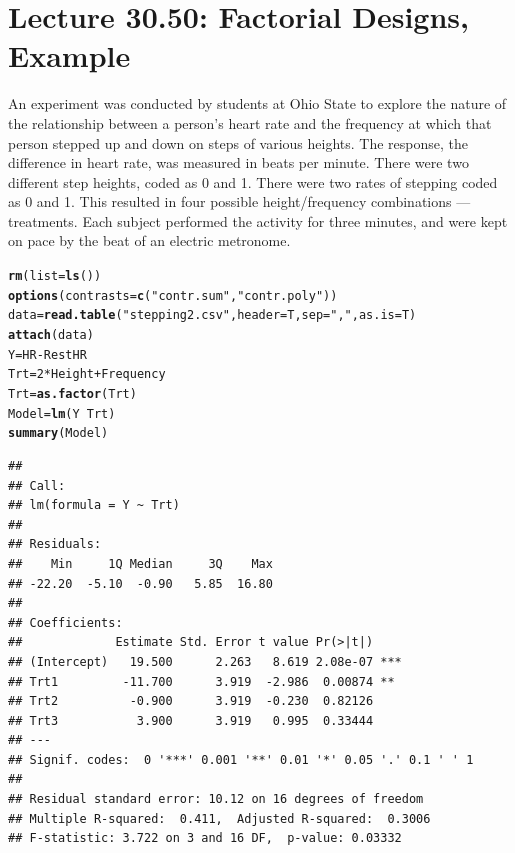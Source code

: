 \documentclass[oneside]{book}\usepackage[]{graphicx}\usepackage[dvipsnames,table,xcdraw]{xcolor}
\makeatletter
\newcommand{\hlnum}[1]{\textcolor[rgb]{0.686,0.059,0.569}{#1}}%
\newcommand{\hlstr}[1]{\textcolor[rgb]{0.192,0.494,0.8}{#1}}%
\newcommand{\hlopt}[1]{\textcolor[rgb]{0,0,0}{#1}}%
\newcommand{\hlstd}[1]{\textcolor[rgb]{0.345,0.345,0.345}{#1}}%
\newcommand{\hlkwb}[1]{\textcolor[rgb]{0.69,0.353,0.396}{#1}}%
\newcommand{\hlkwc}[1]{\textcolor[rgb]{0.333,0.667,0.333}{#1}}%
\newcommand{\hlkwd}[1]{\textcolor[rgb]{0.737,0.353,0.396}{\textbf{#1}}}%
\newenvironment{kframe}{%
 \def\at@end@of@kframe{}%
 \ifinner\ifhmode%
  \def\at@end@of@kframe{\end{minipage}}%
  \begin{minipage}{\columnwidth}%
 \fi\fi%
 \def\FrameCommand##1{\hskip\@totalleftmargin \hskip-\fboxsep
 \colorbox{shadecolor}{##1}\hskip-\fboxsep
     \hskip-\linewidth \hskip-\@totalleftmargin \hskip\columnwidth}%
 \MakeFramed {\advance\hsize-\width
   \@totalleftmargin\z@ \linewidth\hsize
   \@setminipage}}%
 {\par\unskip\endMakeFramed%
 \at@end@of@kframe}
\newenvironment{knitrout}{}{} %
\makeatother
\begin{document}


\section{Lecture 30.50: Factorial Designs, Example}
An experiment was conducted by students at Ohio State to explore the nature of the
relationship between a person's heart rate and the frequency at which that person
stepped up and down on steps of various heights. The response, the difference in heart
rate, was measured in beats per minute. There were two different step heights, coded
as 0 and 1. There were two rates of stepping coded as 0 and 1. This resulted in four
possible height/frequency combinations --- treatments. Each subject performed the
activity for three minutes, and were kept on pace by the beat of an electric metronome.
\begin{knitrout}
\color{fgcolor}\begin{kframe}
\begin{alltt}
\hlkwd{rm}\hlstd{(}\hlkwc{list} \hlstd{=} \hlkwd{ls}\hlstd{())}
\hlkwd{options}\hlstd{(}\hlkwc{contrasts} \hlstd{=} \hlkwd{c}\hlstd{(}\hlstr{"contr.sum"}\hlstd{,} \hlstr{"contr.poly"}\hlstd{))}
\hlstd{data} \hlkwb{=} \hlkwd{read.table}\hlstd{(}\hlstr{"stepping2.csv"}\hlstd{,} \hlkwc{header} \hlstd{= T,} \hlkwc{sep} \hlstd{=} \hlstr{","}\hlstd{,} \hlkwc{as.is} \hlstd{= T)}
\hlkwd{attach}\hlstd{(data)}
\hlstd{Y} \hlkwb{=} \hlstd{HR} \hlopt{-} \hlstd{RestHR}
\hlstd{Trt} \hlkwb{=} \hlnum{2} \hlopt{*} \hlstd{Height} \hlopt{+} \hlstd{Frequency}
\hlstd{Trt} \hlkwb{=} \hlkwd{as.factor}\hlstd{(Trt)}
\hlstd{Model} \hlkwb{=} \hlkwd{lm}\hlstd{(Y} \hlopt{~} \hlstd{Trt)}
\hlkwd{summary}\hlstd{(Model)}
\end{alltt}
\begin{verbatim}
## 
## Call:
## lm(formula = Y ~ Trt)
## 
## Residuals:
##    Min     1Q Median     3Q    Max 
## -22.20  -5.10  -0.90   5.85  16.80 
## 
## Coefficients:
##             Estimate Std. Error t value Pr(>|t|)    
## (Intercept)   19.500      2.263   8.619 2.08e-07 ***
## Trt1         -11.700      3.919  -2.986  0.00874 ** 
## Trt2          -0.900      3.919  -0.230  0.82126    
## Trt3           3.900      3.919   0.995  0.33444    
## ---
## Signif. codes:  0 '***' 0.001 '**' 0.01 '*' 0.05 '.' 0.1 ' ' 1
## 
## Residual standard error: 10.12 on 16 degrees of freedom
## Multiple R-squared:  0.411,	Adjusted R-squared:  0.3006 
## F-statistic: 3.722 on 3 and 16 DF,  p-value: 0.03332
\end{verbatim}
\end{kframe}
\end{knitrout}
\end{document}
